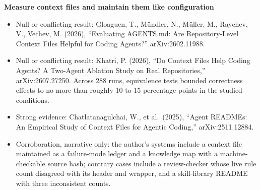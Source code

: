 \textbf{Measure context files and maintain them like configuration}

\begin{itemize}
\tightlist
\item
  Null or conflicting result: Gloaguen, T., Mündler, N., Müller, M., Raychev, V., Vechev, M. (2026), ``Evaluating AGENTS.md: Are Repository-Level Context Files Helpful for Coding Agents?'' arXiv:2602.11988.
\item
  Null or conflicting result: Khatri, P. (2026), ``Do Context Files Help Coding Agents? A Two-Agent Ablation Study on Real Repositories,'' arXiv:2607.27250. Across 288 runs, equivalence tests bounded correctness effects to no more than roughly 10 to 15 percentage points in the studied conditions.
\item
  Strong evidence: Chatlatanagulchai, W., et al.~(2025), ``Agent READMEs: An Empirical Study of Context Files for Agentic Coding,'' arXiv:2511.12884.
\item
  Corroboration, narrative only: the author's systems include a context file maintained as a failure-mode ledger and a knowledge map with a machine-checkable source hash; contrary cases include a review-checker whose live rule count disagreed with its header and wrapper, and a skill-library README with three inconsistent counts.
\end{itemize}
